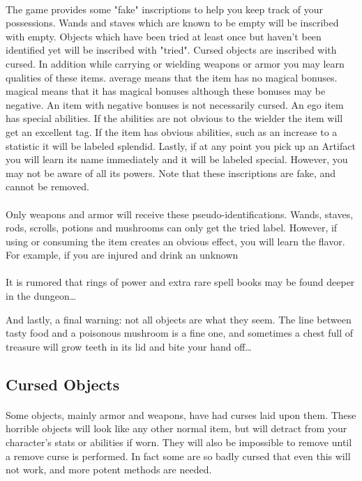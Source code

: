 \paragraph{}The game provides some "fake" inscriptions to help you keep track of your
possessions. Wands and staves which are known to be empty will be inscribed
with {empty}. Objects which have been tried at least once but haven't been
identified yet will be inscribed with "tried". Cursed objects are inscribed
with {cursed}. In addition while carrying or wielding weapons or armor you
may learn qualities of these items. {average} means that the item has no
magical bonuses. {magical} means that it has magical bonuses although these
bonuses may be negative. An item with negative bonuses is not necessarily
cursed. An {ego} item has special abilities. If the abilities are not
obvious to the wielder the item will get an {excellent} tag. If the item has
obvious abilities, such as an increase to a statistic it will be labeled
{splendid}. Lastly, if at any point you pick up an Artifact you will learn
its name immediately and it will be labeled {special}. However, you may not
be aware of all its powers. Note that these inscriptions are fake, and cannot
be removed.

\paragraph{}Only weapons and armor will receive these pseudo-identifications. Wands,
staves, rods, scrolls, potions and mushrooms can only get the {tried} label.
However, if using or consuming the item creates an obvious effect, you will
learn the flavor. For example, if you are injured and drink an unknown

\paragraph{}It is rumored that rings of power and extra rare spell books
may be found deeper in the dungeon\ldots

And lastly, a final warning: not all objects are what they seem. The line
between tasty food and a poisonous mushroom is a fine one, and sometimes a
chest full of treasure will grow teeth in its lid and bite your hand
off\ldots


\subsection{Cursed Objects}
\paragraph{}Some objects, mainly armor and weapons, have had curses laid upon them.
These horrible objects will look like any other normal item, but will
detract from your character's stats or abilities if worn. They will also
be impossible to remove until a remove curse is performed. In fact some
are so badly cursed that even this will not work, and more potent methods
are needed.

